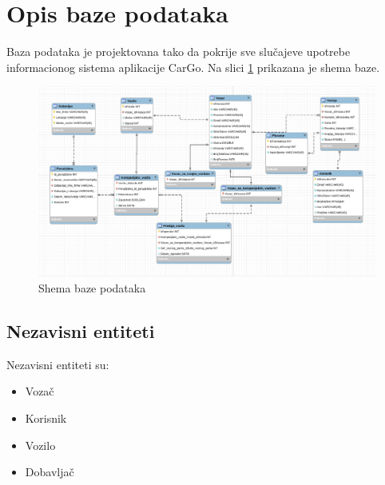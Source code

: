 \section{\bfseries Opis baze podataka}
Baza podataka je projektovana tako da pokrije sve slučajeve upotrebe informacionog sistema aplikacije CarGo. Na slici \ref{fig:bazaPodataka} prikazana je shema baze.

\begin{figure}[H]
\begin{center}
\includegraphics[width=\textwidth]{Slike/EERDijagramBazePodataka.png}
\end{center}
    \caption{Shema baze podataka}
\label{fig:bazaPodataka}
\end{figure}

\subsection{\textbf{Nezavisni entiteti}}Nezavisni entiteti su:
    \begin{itemize}
        \item Vozač
        \item Korisnik
        \item Vozilo
        \item Dobavljač
    \end{itemize}

